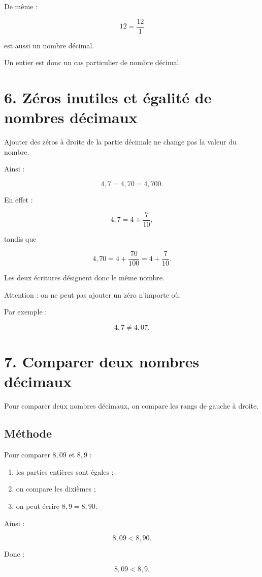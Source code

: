 De même :

\[
12=\dfrac{12}{1}
\]

est aussi un nombre décimal.

Un entier est donc un cas particulier de nombre décimal.

\section{6. Zéros inutiles et égalité de nombres décimaux}

Ajouter des zéros à droite de la partie décimale ne change pas la valeur du nombre.

Ainsi :

\[
4{,}7=4{,}70=4{,}700.
\]

En effet :

\[
4{,}7
=
4+\dfrac{7}{10},
\]

tandis que

\[
4{,}70
=
4+\dfrac{70}{100}
=
4+\dfrac{7}{10}.
\]

Les deux écritures désignent donc le même nombre.

Attention : on ne peut pas ajouter un zéro n’importe où.

Par exemple :

\[
4{,}7\neq4{,}07.
\]

\section{7. Comparer deux nombres décimaux}

Pour comparer deux nombres décimaux, on compare les rangs de gauche à droite.

\subsection{Méthode}

Pour comparer $8{,}09$ et $8{,}9$ :

\begin{enumerate}
\item les parties entières sont égales ;
\item on compare les dixièmes ;
\item on peut écrire $8{,}9=8{,}90$.
\end{enumerate}

Ainsi :

\[
8{,}09<8{,}90.
\]

Donc :

\[
\boxed{8{,}09<8{,}9}.
\]

